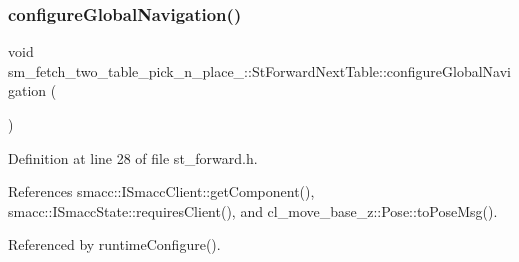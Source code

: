 \subsubsection{\texorpdfstring{configure\+Global\+Navigation()}{configureGlobalNavigation()}}
{\footnotesize\ttfamily void sm\+\_\+fetch\+\_\+two\+\_\+table\+\_\+pick\+\_\+n\+\_\+place\+\_\+::\+St\+Forward\+Next\+Table\+::configure\+Global\+Navigation (\begin{DoxyParamCaption}{ }\end{DoxyParamCaption})\hspace{0.3cm}{\ttfamily [inline]}}



Definition at line 28 of file st\+\_\+forward.\+h.



References smacc\+::\+I\+Smacc\+Client\+::get\+Component(), smacc\+::\+I\+Smacc\+State\+::requires\+Client(), and cl\+\_\+move\+\_\+base\+\_\+z\+::\+Pose\+::to\+Pose\+Msg().



Referenced by runtime\+Configure().


